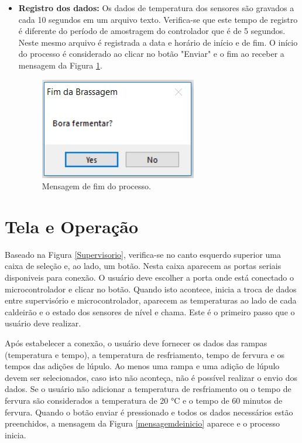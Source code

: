 \begin{itemize}
\item \textbf{Registro dos dados:}
Os dados de temperatura dos sensores são gravados a cada 10 segundos em um arquivo texto. Verifica-se que este tempo de registro é diferente do período de amostragem do controlador que é de 5 segundos. Neste mesmo arquivo é registrada a data e horário de início e de fim. O início do processo é considerado ao clicar no botão "Enviar" e o fim ao receber a mensagem da Figura \ref{mensagemdefim}. 

  \begin{figure}[htb]
	\caption{\label{mensagemdefim}Mensagem de fim do processo.}
	\begin{center}
	    \includegraphics[width=0.25\linewidth]{./img/mensagemdefim.jpg}
	\end{center}
\end{figure}
\end{itemize}

		\section{Tela e Operação}
Baseado na Figura \ref{Supervisorio}, verifica-se no canto esquerdo superior uma caixa de seleção e, ao lado, um botão. Nesta caixa aparecem as portas seriais disponiveis para conexão. O usuário deve escolher a porta onde está conectado o microcontrolador e clicar no botão. Quando isto acontece, inicia a troca de dados entre supervisório e microcontrolador, aparecem as temperaturas ao lado de cada caldeirão e o estado dos sensores de nível e chama. Este é o primeiro passo que o usuário deve realizar.

Após estabelecer a conexão, o usuário deve fornecer os dados das rampas (temperatura e tempo), a temperatura de resfriamento, tempo de fervura e os tempos das adições de lúpulo. Ao menos uma rampa e uma adição de lúpulo devem ser selecionados, caso isto não aconteça, não é possível realizar o envio dos dados. Se o usuário não adicionar a temperatura de resfriamento ou o tempo de fervura são considerados a temperatura de 20 °C e o tempo de 60 minutos de fervura. Quando o botão enviar é pressionado e todos os dados necessários estão preenchidos, a mensagem da Figura \ref{mensagemdeinicio} aparece e o processo inicia. 

